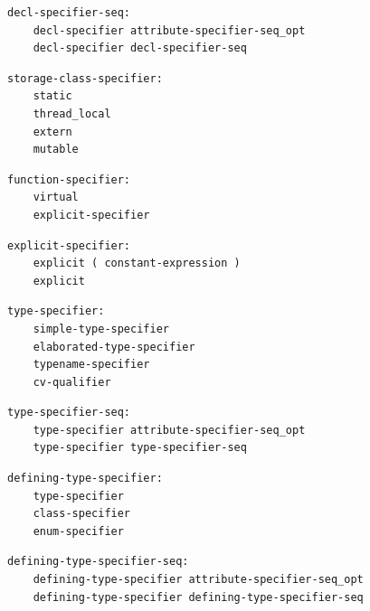 \noindent\textbf{\texttt{}}\par
\begin{lstlisting}
decl-specifier-seq:
    decl-specifier attribute-specifier-seq_opt
    decl-specifier decl-specifier-seq
\end{lstlisting}

\noindent\textbf{\texttt{}}\par
\begin{lstlisting}
storage-class-specifier:
    static
    thread_local
    extern
    mutable
\end{lstlisting}

\noindent\textbf{\texttt{}}\par
\begin{lstlisting}
function-specifier:
    virtual
    explicit-specifier
\end{lstlisting}

\noindent\textbf{\texttt{}}\par
\begin{lstlisting}
explicit-specifier:
    explicit ( constant-expression )
    explicit
\end{lstlisting}

\noindent\textbf{\texttt{}}\par
\begin{lstlisting}
type-specifier:
    simple-type-specifier
    elaborated-type-specifier
    typename-specifier
    cv-qualifier
\end{lstlisting}

\noindent\textbf{\texttt{}}\par
\begin{lstlisting}
type-specifier-seq:
    type-specifier attribute-specifier-seq_opt
    type-specifier type-specifier-seq
\end{lstlisting}

\noindent\textbf{\texttt{}}\par
\begin{lstlisting}
defining-type-specifier:
    type-specifier
    class-specifier
    enum-specifier
\end{lstlisting}

\noindent\textbf{\texttt{}}\par
\begin{lstlisting}
defining-type-specifier-seq:
    defining-type-specifier attribute-specifier-seq_opt
    defining-type-specifier defining-type-specifier-seq
\end{lstlisting}


